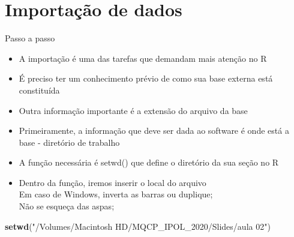 \documentclass[
  10pt,
  ignorenonframetext,
]{beamer}
\newenvironment{Shaded}{\begin{snugshade}}{\end{snugshade}}
\newcommand{\KeywordTok}[1]{\textcolor[rgb]{0.13,0.29,0.53}{\textbf{#1}}}
\newcommand{\NormalTok}[1]{#1}
\newcommand{\StringTok}[1]{\textcolor[rgb]{0.31,0.60,0.02}{#1}}
\providecommand{\tightlist}{%
  \setlength{\itemsep}{0pt}\setlength{\parskip}{0pt}}
\begin{document}
\hypertarget{importauxe7uxe3o-de-dados}{%
\section{Importação de dados}\label{importauxe7uxe3o-de-dados}}

\begin{frame}[fragile]{Passo a passo}
\protect\hypertarget{passo-a-passo}{}
\begin{itemize}
\tightlist
\item
  A importação é uma das tarefas que demandam mais atenção no R
\item
  É preciso ter um conhecimento prévio de como sua base externa está
  constituída
\item
  Outra informação importante é a extensão do arquivo da base
\item
  Primeiramente, a informação que deve ser dada ao software é onde está
  a base - diretório de trabalho
\item
  A função necessária é setwd() que define o diretório da sua seção no R
\item
  Dentro da função, iremos inserir o local do arquivo\\
  Em caso de Windows, inverta as barras ou duplique;\\
  Não se esqueça das aspas;
\end{itemize}

\begin{Shaded}
\begin{Highlighting}[]
\KeywordTok{setwd}\NormalTok{(}\StringTok{"/Volumes/Macintosh HD/MQCP\_IPOL\_2020/Slides/aula 02"}\NormalTok{)}
\end{Highlighting}
\end{Shaded}
\end{frame}
\end{document}
